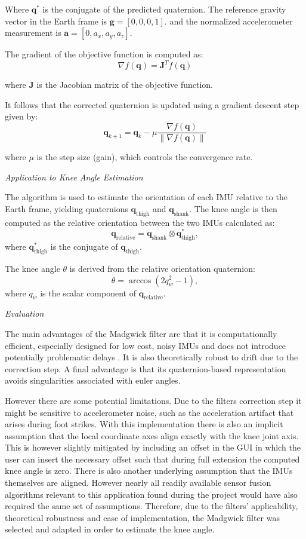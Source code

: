 Where  \( \mathbf{q}^* \) is the conjugate of the predicted quaternion. The reference gravity vector in the Earth frame is \(\mathbf{g} = [0, 0, 0, 1].\) and the normalized accelerometer measurement is
    \(
    \mathbf{a} = [0, a_x, a_y, a_z].
    \)

The gradient of the objective function is computed as:
\[
\nabla f(\mathbf{q}) = \mathbf{J}^T f(\mathbf{q})
\]

where \( \mathbf{J} \) is the Jacobian matrix of the objective function.

It follows that the corrected quaternion is updated using a gradient descent step given by:
\[
\mathbf{q}_{k+1} = \mathbf{q}_k - \mu \frac{\nabla f(\mathbf{q})}{\|\nabla f(\mathbf{q})\|}
\]

where \( \mu \) is the step size (gain), which controls the convergence rate.


\textit{Application to Knee Angle Estimation}

 The algorithm is used to estimate the orientation of each IMU relative to the Earth frame, yielding quaternions \( \mathbf{q}_{\text{thigh}} \) and \( \mathbf{q}_{\text{shank}} \). The knee angle is then computed as the relative orientation between the two IMUs calculated as:
\[
\mathbf{q}_{\text{relative}} = \mathbf{q}_{\text{shank}} \otimes \mathbf{q}_{\text{thigh}}^*,
\]
where \( \mathbf{q}_{\text{thigh}}^* \) is the conjugate of \( \mathbf{q}_{\text{thigh}} \).

The knee angle \( \theta \) is derived from the relative orientation quaternion:
\[
\theta = \arccos{\left( 2q_w^2 - 1 \right)},
\]
where \( q_w \) is the scalar component of \( \mathbf{q}_{\text{relative}} \).

\textit{Evaluation}

The main advantages of the Madgwick filter are that it is computationally efficient, especially designed for low cost, noisy IMUs and does not introduce potentially problematic delays . It is also theoretically robust to drift due to the correction step. A final advantage is that its quaternion-based representation avoids singularities associated with euler angles. 

However there are some potential limitations. Due to the filters correction step it might be sensitive to accelerometer noise, such as the acceleration artifact that arises during foot strikes. With this implementation there is also an implicit assumption that the local coordinate axes align exactly with the knee joint axis. This is however slightly mitigated by including an offset in the GUI in which the user can insert the necessary offset such that during full extension the computed knee angle is zero. There is also another underlying assumption that the IMUs themselves are aligned. However nearly all readily available sensor fusion algorithms relevant to this application found during the project would have also required the same set of assumptions. Therefore, due to the filters' applicability, theoretical robustness and ease of implementation, the Madgwick filter was selected and adapted in order to estimate the knee angle.


